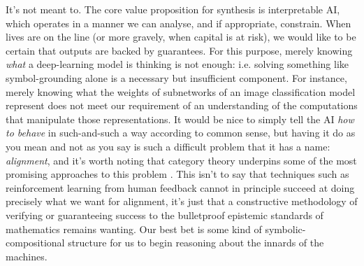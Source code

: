 It's not meant to. The core value proposition for synthesis is interpretable AI, which operates in a manner we can analyse, and if appropriate, constrain. When lives are on the line (or more gravely, when capital is at risk), we would like to be certain that outputs are backed by guarantees. For this purpose, merely knowing \emph{what} a deep-learning model is thinking is not enough: i.e. solving something like symbol-grounding alone is a necessary but insufficient component. For instance, merely knowing what the weights of subnetworks of an image classification model represent does not meet our requirement of an understanding of the computations that manipulate those representations. It would be nice to simply tell the AI \emph{how to behave} in such-and-such a way according to common sense, but having it do as you mean and not as you say is such a difficult problem that it has a name: \emph{alignment}, and it's worth noting that category theory underpins some of the most promising approaches to this problem \citep{davidadOpenAgencyArchitecture}. This isn't to say that techniques such as reinforcement learning from human feedback cannot in principle succeed at doing precisely what we want for alignment, it's just that a constructive methodology of verifying or guaranteeing success to the bulletproof epistemic standards of mathematics remains wanting. Our best bet is some kind of symbolic-compositional structure for us to begin reasoning about the innards of the machines.\\

